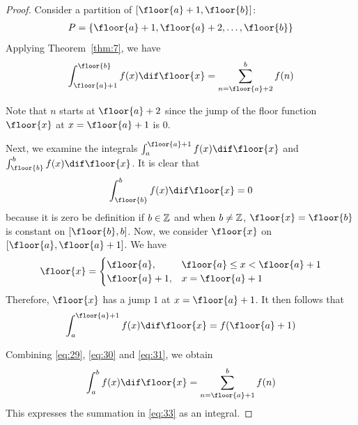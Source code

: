 \documentclass[thmcnt=section, color=blue, 12pt]{my-elegantbook}
\begin{document}
\begin{proof}
	Consider a partition of $[\floor{a}+1, \floor{b}]$:
	\begin{align*}
		P = \{\floor{a}+1, \floor{a}+2, \ldots, \floor{b}\}
	\end{align*}
	Applying Theorem~\ref{thm:7}, we have
	\begin{align}
		\int_{\floor{a}+1}^{\floor{b}} f(x) \dif \floor{x}
		= \sum_{n=\floor{a}+2}^b f(n)
		\label{eq:29}
	\end{align}
	\begin{note}
		Note that $n$ starts at $\floor{a}+2$
		since the jump of the floor function $\floor{x}$
		at $x=\floor{a}+1$ is $0$.
	\end{note}

	Next, we examine the integrals $\int_a^{\floor{a}+1} f(x) \dif \floor{x}$
	and $\int_{\floor{b}}^b f(x) \dif \floor{x}$.
	It is clear that
	\begin{align}
		\int_{\floor{b}}^b f(x) \dif \floor{x} = 0
		\label{eq:30}
	\end{align}
	because it is zero be definition if $b \in \mathbb{Z}$
	and when $b \neq \mathbb{Z}$, $\floor{x} = \floor{b}$ is constant on $[\floor{b}, b]$.
	Now, we consider $\floor{x}$ on $[\floor{a}, \floor{a}+1]$.
	We have
	\begin{align*}
		\floor{x} = \begin{cases}
			            \floor{a},   & \floor{a} \leq x < \floor{a}+1 \\
			            \floor{a}+1, & x=\floor{a}+1
		            \end{cases}
	\end{align*}
	Therefore, $\floor{x}$ has a jump $1$ at $x=\floor{a}+1$.
	It then follows that
	\begin{align}
		\int_a^{\floor{a}+1} f(x) \dif \floor{x}
		= f(\floor{a}+1)
		\label{eq:31}
	\end{align}

	Combining \eqref{eq:29}, \eqref{eq:30} and \eqref{eq:31}, we obtain
	\begin{align}
		\int_a^b f(x) \dif \floor{x} = \sum_{n=\floor{a}+1}^b f(n)
		\label{eq:32}
	\end{align}
	This expresses the summation in \eqref{eq:33}
	as an integral.



\end{proof}
\end{document}
